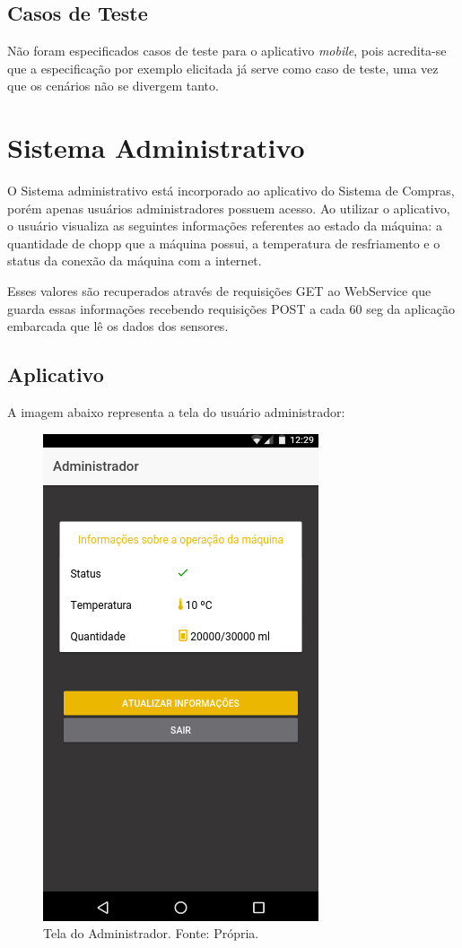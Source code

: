 \subsection{Casos de Teste}

Não foram especificados casos de teste para o aplicativo \textit{mobile}, pois acredita-se que a especificação por exemplo elicitada já serve como caso de teste, uma vez que os cenários não se divergem tanto.


\section[Sistema Administrativo]{Sistema Administrativo}

O Sistema administrativo está incorporado ao aplicativo do Sistema de Compras, porém apenas usuários administradores possuem acesso. Ao utilizar o aplicativo, o usuário visualiza as seguintes informações referentes ao estado da máquina: a quantidade de chopp que a máquina possui, a temperatura de resfriamento e o status da conexão da máquina com a internet.

Esses valores são recuperados através de requisições GET ao WebService que guarda essas informações recebendo requisições POST a cada 60 seg da aplicação embarcada que lê os dados dos sensores. 

\subsection{Aplicativo}

A imagem abaixo representa a tela do usuário administrador:

\begin{figure}[!htb]
    \centering
    \includegraphics[scale= 0.4]{figuras/Aplicativo/admin.png}        
    \caption{Tela do Administrador. Fonte: Própria.}    
    \label{home-page}
\end{figure}


